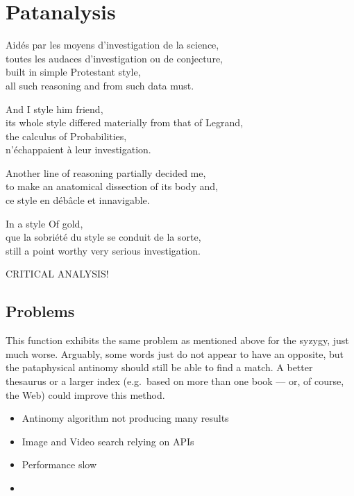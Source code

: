 
\chapter{Patanalysis}
\label{ch:analysis}

\startcontents[chapters]

\vfill

Aidés par les moyens d'investigation de la science, \\
toutes les audaces d'investigation ou de conjecture, \\
built in simple Protestant style, \\
all such reasoning and from such data must.

And I style him friend, \\
its whole style differed materially from that of Legrand, \\
the calculus of Probabilities, \\
n'échappaient à leur investigation.

Another line of reasoning partially decided me, \\
to make an anatomical dissection of its body and, \\
ce style en débâcle et innavigable.

In a style Of gold, \\
que la sobriété du style se conduit de la sorte, \\
still a point worthy very serious investigation.

\newpage
\minicontents
\spirals


CRITICAL ANALYSIS!


\section{Problems}

This function exhibits the same problem as mentioned above for the syzygy, just much worse. Arguably, some words just do not appear to have an opposite, but the pataphysical antinomy should still be able to find a match. A better thesaurus or a larger index (e.g.\ based on more than one book –-- or, of course, the Web) could improve this method.

\begin{itemize}
  \item Antinomy algorithm not producing many results
  \item Image and Video search relying on APIs
  \item Performance slow
  \item
\end{itemize}


